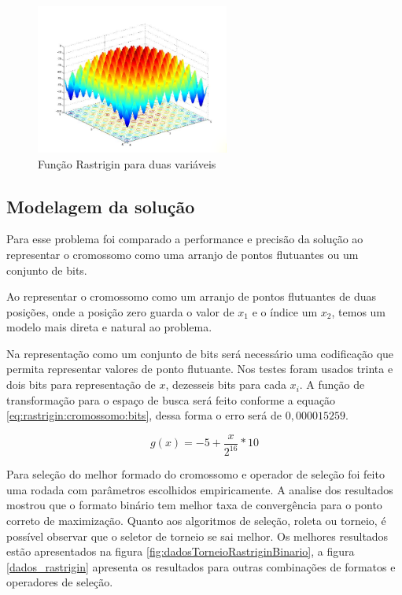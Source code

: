 \documentclass[conference]{IEEEtran}
\begin{document}
\begin{figure}[!t]
        \centering
        \includegraphics[width=2.5in]{imagens/rastrigin.png}
        \caption{Função Rastrigin para duas variáveis}
        \label{fig:rastrigin}
\end{figure}

\subsection{Modelagem da solução}

Para esse problema foi comparado a performance e precisão da solução ao representar o cromossomo como uma arranjo de pontos flutuantes ou um conjunto de bits.

Ao representar o cromossomo como um arranjo de pontos flutuantes de duas posições, onde a posição zero guarda o valor de $x_1$ e o índice um $x_2$, temos um modelo mais direta e natural ao problema.
 
Na representação como um conjunto de bits será necessário uma codificação que permita representar valores de ponto flutuante. Nos testes foram usados trinta e dois bits para representação de $x$, dezesseis bits para cada $x_i$. A função de transformação para o espaço de busca será feito conforme a equação \ref{eq:rastrigin:cromossomo:bits}, dessa forma o erro será de $0,000015259$.

\begin{equation}\label{eq:rastrigin:cromossomo:bits}
g(x) = -5 + \frac{x}{2^{16}} * 10
\end{equation}

Para seleção do melhor formado do cromossomo e operador de seleção foi feito uma rodada com parâmetros escolhidos empiricamente. A analise dos resultados mostrou que o formato binário tem melhor taxa de convergência para o ponto correto de maximização. Quanto aos algoritmos de seleção, roleta ou torneio, é possível observar que o seletor de torneio se sai melhor. Os melhores resultados estão apresentados na figura \ref{fig:dadosTorneioRastriginBinario}, a figura \ref{dados_rastrigin} apresenta os resultados para outras combinações de formatos e operadores de seleção.
\end{document}
